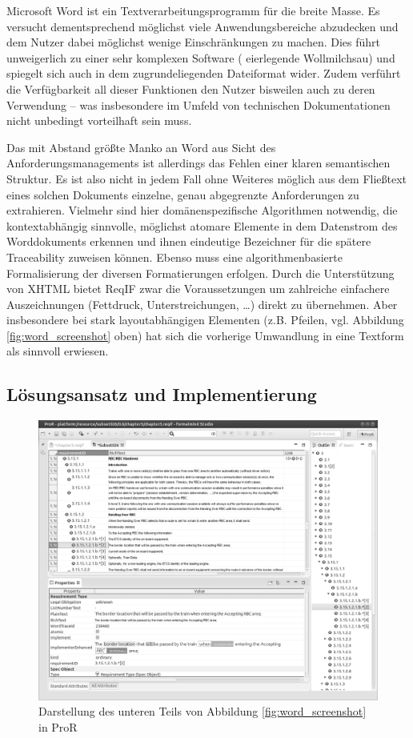 \documentclass[twoside]{article}
\begin{document}
\begin{multicols}{2}
Microsoft Word ist ein Textverarbeitungsprogramm für die breite Masse. Es versucht dementsprechend möglichst viele Anwendungsbereiche abzudecken und dem Nutzer dabei möglichst wenige Einschränkungen zu machen. Dies führt unweigerlich zu einer sehr komplexen Software (\glqq{} eierlegende Wollmilchsau\grqq{}) und spiegelt sich auch in dem zugrundeliegenden Dateiformat wider. Zudem verführt die Verfügbarkeit all dieser Funktionen den Nutzer bisweilen auch zu deren Verwendung -- was insbesondere im Umfeld von technischen Dokumentationen nicht unbedingt vorteilhaft sein muss.

Das mit Abstand größte Manko an Word aus Sicht des Anforderungsmanagements ist allerdings das Fehlen einer klaren semantischen Struktur. Es ist also nicht in jedem Fall ohne Weiteres möglich aus dem Fließtext eines solchen Dokuments einzelne, genau abgegrenzte Anforderungen zu extrahieren. Vielmehr sind hier domänenspezifische Algorithmen notwendig, die kontextabhängig sinnvolle, möglichst atomare Elemente in dem Datenstrom des Worddokuments erkennen und ihnen eindeutige Bezeichner für die spätere Traceability zuweisen können. Ebenso muss eine algorithmenbasierte Formalisierung der diversen Formatierungen erfolgen. Durch die Unterstützung von XHTML bietet ReqIF zwar die Voraussetzungen um zahlreiche einfachere Auszeichnungen (Fettdruck, Unterstreichungen, \ldots{}) direkt zu übernehmen. Aber insbesondere bei stark layoutabhängigen Elementen (z.B. Pfeilen, vgl. Abbildung \ref{fig:word_screenshot} oben) hat sich die vorherige Umwandlung in eine Textform als sinnvoll erwiesen.

\subsection{Lösungsansatz und Implementierung}


\begin{figure}
\centering
\includegraphics[width=0.8\linewidth]{img/pror_screenshot.png}
\caption{Darstellung des unteren Teils von Abbildung \ref{fig:word_screenshot} in ProR}
\label{fig:pror_screenshot}
\end{figure}


\end{multicols}
\end{document}
